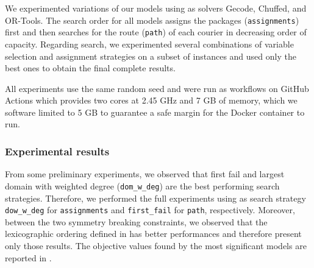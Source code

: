 We experimented variations of our models using as solvers Gecode, Chuffed, and OR-Tools. The search order for all models assigns the packages (\texttt{assignments}) first and then searches for the route (\texttt{path}) of each courier in decreasing order of capacity. Regarding search, we experimented several combinations of variable selection and assignment strategies on a subset of instances and used only the best ones to obtain the final complete results.

All experiments use the same random seed and were run as workflows on GitHub Actions which provides two cores at 2.45 GHz and 7 GB of memory, which we software limited to 5 GB to guarantee a safe margin for the Docker container to run.


\subsubsection{Experimental results}

From some preliminary experiments, we observed that first fail and largest domain with weighted degree (\texttt{dom\_w\_deg}) are the best performing search strategies. Therefore, we performed the full experiments using as search strategy \texttt{dow\_w\_deg} for \texttt{assignments} and \texttt{first\_fail} for \texttt{path}, respectively. Moreover, between the two symmetry breaking constraints, we observed that the lexicographic ordering defined in  has better performances and therefore present only those results. The objective values found by the most significant models are reported in .

